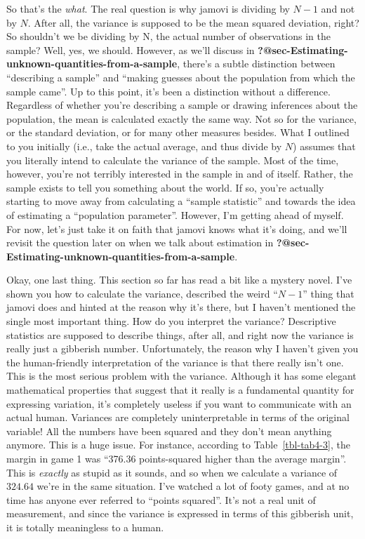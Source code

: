 \documentclass[
  a4paper,
]{book}
\begin{document}
So that's the \emph{what}. The real question is why jamovi is dividing
by \(N - 1\) and not by \(N\). After all, the variance is supposed to be
the mean squared deviation, right? So shouldn't we be dividing by N, the
actual number of observations in the sample? Well, yes, we should.
However, as we'll discuss in
\textbf{?@sec-Estimating-unknown-quantities-from-a-sample}, there's a
subtle distinction between ``describing a sample'' and ``making guesses
about the population from which the sample came''. Up to this point,
it's been a distinction without a difference. Regardless of whether
you're describing a sample or drawing inferences about the population,
the mean is calculated exactly the same way. Not so for the variance, or
the standard deviation, or for many other measures besides. What I
outlined to you initially (i.e., take the actual average, and thus
divide by \(N\)) assumes that you literally intend to calculate the
variance of the sample. Most of the time, however, you're not terribly
interested in the sample in and of itself. Rather, the sample exists to
tell you something about the world. If so, you're actually starting to
move away from calculating a ``sample statistic'' and towards the idea
of estimating a ``population parameter''. However, I'm getting ahead of
myself. For now, let's just take it on faith that jamovi knows what it's
doing, and we'll revisit the question later on when we talk about
estimation in
\textbf{?@sec-Estimating-unknown-quantities-from-a-sample}.

Okay, one last thing. This section so far has read a bit like a mystery
novel. I've shown you how to calculate the variance, described the weird
``\(N - 1\)'' thing that jamovi does and hinted at the reason why it's
there, but I haven't mentioned the single most important thing. How do
you interpret the variance? Descriptive statistics are supposed to
describe things, after all, and right now the variance is really just a
gibberish number. Unfortunately, the reason why I haven't given you the
human-friendly interpretation of the variance is that there really isn't
one. This is the most serious problem with the variance. Although it has
some elegant mathematical properties that suggest that it really is a
fundamental quantity for expressing variation, it's completely useless
if you want to communicate with an actual human. Variances are
completely uninterpretable in terms of the original variable! All the
numbers have been squared and they don't mean anything anymore. This is
a huge issue. For instance, according to Table~\ref{tbl-tab4-3}, the
margin in game 1 was ``376.36 points-squared higher than the average
margin''. This is \emph{exactly} as stupid as it sounds, and so when we
calculate a variance of \(324.64\) we're in the same situation. I've
watched a lot of footy games, and at no time has anyone ever referred to
``points squared''. It's not a real unit of measurement, and since the
variance is expressed in terms of this gibberish unit, it is totally
meaningless to a human.
\end{document}
